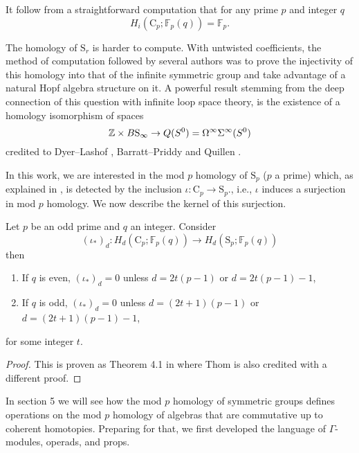 It follow from a straightforward computation that for any prime $p$ and integer $q$
\begin{equation*}
H_i(\mathrm{C}_p; \mathbb{F}_p(q)) = \mathbb{F}_p.
\end{equation*}

The homology of $\mathrm{S}_r$ is harder to compute.
With untwisted coefficients, the method of computation followed by several authors was to prove the injectivity of this homology into that of the infinite symmetric group and take advantage of a natural Hopf algebra structure on it.
A powerful result stemming from the deep connection of this question with infinite loop space theory, is the existence of a homology isomorphism of spaces
\begin{equation*}
\mathbb{Z} \times B\mathrm{S}_\infty \to Q(S^0) = \Omega^\infty \Sigma^\infty (S^0)
\end{equation*}
credited to Dyer--Lashof \cite{dyer62lashof}, Barratt--Priddy and Quillen \cite{barratt1972priddyquillen}.

In this work, we are interested in the mod $p$ homology of $\mathrm{S}_p$ ($p$ a prime) which, as explained in \cite[Corollary~VI.1.4]{adem2004milgram}, is detected by the inclusion $\iota \colon \mathrm{C}_p \to \mathrm{S}_p$., i.e., $\iota$ induces a surjection in mod $p$ homology.
We now describe the kernel of this surjection.

\begin{lemma} \label{lem: Thom's theorem}
	Let $p$ be an odd prime and $q$ an integer.
	Consider
	\begin{equation*}
	(\iota_\ast)_d \colon H_d(\mathrm{C}_p; \mathbb{F}_p(q)) \to H_d(\mathrm{S}_p; \mathbb{F}_p(q))
	\end{equation*}
	then
	\begin{enumerate}
		\item If $q$ is even, $(\iota_\ast)_d = 0$ unless $d = 2t(p-1)$ or $d = 2t(p-1) - 1$,
		\item If $q$ is odd, $(\iota_\ast)_d = 0$ unless $d = (2t+1)(p-1)$ or $d = (2t+1)(p-1)-1$,
	\end{enumerate}
	for some integer $t$.
\end{lemma}

\begin{proof}
	This is proven as Theorem 4.1 in \cite{steenrod1953cyclic} where Thom is also credited with a different proof.
\end{proof}

In section 5 we will see how the mod $p$ homology of symmetric groups defines operations on the mod $p$ homology of algebras that are commutative up to coherent homotopies.
Preparing for that, we first developed the language of $\Gamma$-modules, operads, and props.
